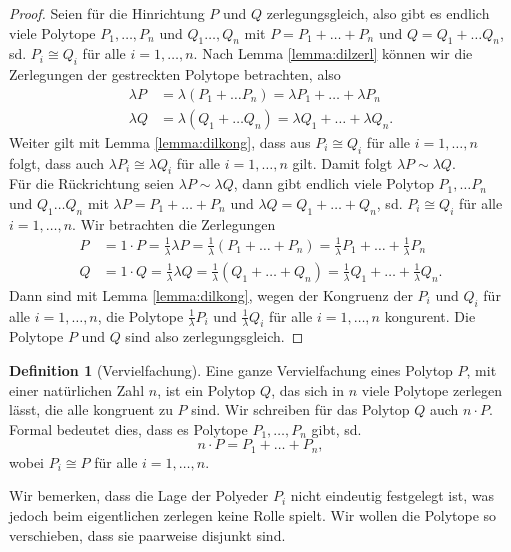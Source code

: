 \documentclass[11pt,titlepage]{article}
\theoremstyle{definition}
\newtheorem{definition}[theorem]{Definition}
\theoremstyle{remark}
\begin{document}
	\begin{proof}
		Seien für die Hinrichtung $P$ und $Q$ zerlegungsgleich, also gibt 
		es endlich viele Polytope $P_1,\ldots,P_n$ und $Q_1\ldots,Q_n$ mit 
		$P=P_1+\ldots+P_n$ und $Q=Q_1+\ldots Q_n$, sd. $P_i\cong Q_i$ 
		für alle $i=1,\ldots, n$. Nach Lemma \ref{lemma:dilzerl} können wir 
		die Zerlegungen der gestreckten Polytope betrachten, also
		\begin{align*}
			\lambda P&=\lambda (P_1+\ldots P_n)=\lambda P_1 +\ldots+\lambda P_n \\
			\lambda Q&=\lambda (Q_1+\ldots Q_n)=\lambda Q_1 +\ldots+\lambda Q_n.
		\end{align*}
		Weiter gilt mit Lemma \ref{lemma:dilkong}, dass aus $P_i\cong Q_i$ 
		für alle $i=1,\ldots,n$ folgt, dass auch $\lambda P_i\cong\lambda Q_i$ 
		für alle $i=1,\ldots,n$ gilt. Damit folgt $\lambda P\sim \lambda Q$. \\
		Für die Rückrichtung seien $\lambda P\sim \lambda Q$, dann gibt 
		endlich viele Polytop $P_1,\ldots P_n$ und $Q_1\ldots Q_n$ mit 
		$\lambda P=P_1+\ldots+P_n$ und $\lambda Q=Q_1+\ldots+Q_n$, sd. 
		$P_i\cong Q_i$ für alle $i=1,\ldots,n$. Wir betrachten die 
		Zerlegungen
		\begin{align*}
			P&=1\cdot P=\frac{1}{\lambda}\lambda P=\frac{1}{\lambda}(P_1+\ldots+P_n)
			=\frac{1}{\lambda}P_1+\ldots+\frac{1}{\lambda}P_n \\
			Q&=1\cdot Q=\frac{1}{\lambda}\lambda Q=\frac{1}{\lambda}(Q_1+\ldots+Q_n)
			=\frac{1}{\lambda}Q_1+\ldots+\frac{1}{\lambda}Q_n.
		\end{align*}
		Dann sind mit Lemma \ref{lemma:dilkong}, wegen der Kongruenz der $P_i$ und 
		$Q_i$ für alle $i=1,\ldots,n$, die Polytope $\frac{1}{\lambda}P_i$ und 
		$\frac{1}{\lambda}Q_i$ für alle $i=1,\ldots,n$ kongurent. 
		Die Polytope $P$ und $Q$ sind also zerlegungsgleich.
	\end{proof}
	
	\begin{definition}[Vervielfachung]
		Eine ganze Vervielfachung eines Polytop 
		$P$, mit einer natürlichen Zahl $n$, ist ein Polytop $Q$, 
		das sich in $n$ viele Polytope zerlegen lässt, die alle kongruent zu 
		$P$ sind. Wir schreiben für das Polytop $Q$ auch $n\cdot P$. Formal 
		bedeutet dies, dass es Polytope $P_1,\ldots,P_n$ gibt, sd.
		\[n\cdot P=P_1+\ldots+P_n,\]
		wobei $P_i\cong P$ für alle $i=1,\ldots,n$.
	\end{definition}
	
	Wir bemerken, dass die Lage der Polyeder $P_i$ nicht eindeutig festgelegt 
	ist, was jedoch beim eigentlichen zerlegen keine Rolle spielt. Wir wollen 
	die Polytope so verschieben, dass sie paarweise disjunkt sind.
	
\end{document}
